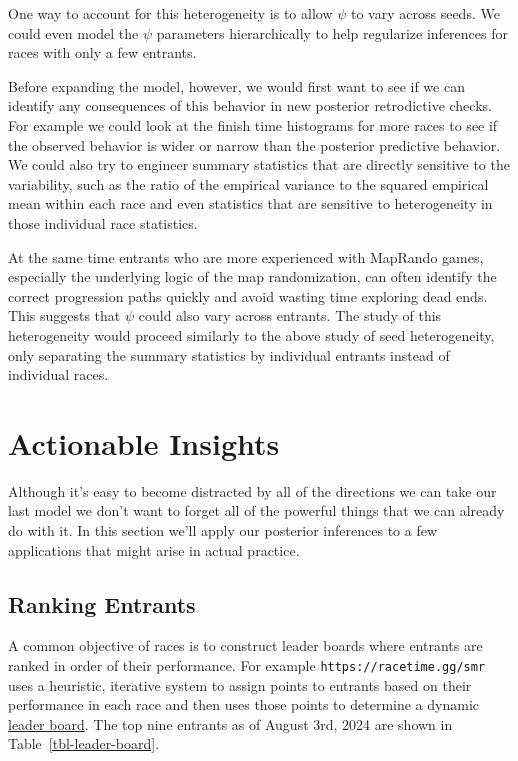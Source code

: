 \documentclass[
  letterpaper,
  DIV=11,
  numbers=noendperiod]{scrartcl}
\begin{document}
One way to account for this heterogeneity is to allow \(\psi\) to vary
across seeds. We could even model the \(\psi\) parameters hierarchically
to help regularize inferences for races with only a few entrants.

Before expanding the model, however, we would first want to see if we
can identify any consequences of this behavior in new posterior
retrodictive checks. For example we could look at the finish time
histograms for more races to see if the observed behavior is wider or
narrow than the posterior predictive behavior. We could also try to
engineer summary statistics that are directly sensitive to the
variability, such as the ratio of the empirical variance to the squared
empirical mean within each race and even statistics that are sensitive
to heterogeneity in those individual race statistics.

At the same time entrants who are more experienced with MapRando games,
especially the underlying logic of the map randomization, can often
identify the correct progression paths quickly and avoid wasting time
exploring dead ends. This suggests that \(\psi\) could also vary across
entrants. The study of this heterogeneity would proceed similarly to the
above study of seed heterogeneity, only separating the summary
statistics by individual entrants instead of individual races.

\section{Actionable Insights}\label{actionable-insights}

Although it's easy to become distracted by all of the directions we can
take our last model we don't want to forget all of the powerful things
that we can already do with it. In this section we'll apply our
posterior inferences to a few applications that might arise in actual
practice.

\subsection{Ranking Entrants}\label{ranking-entrants}

A common objective of races is to construct leader boards where entrants
are ranked in order of their performance. For example
\texttt{https://racetime.gg/smr} uses a heuristic, iterative system to
assign points to entrants based on their performance in each race and
then uses those points to determine a dynamic
\href{https://racetime.gg/smr/leaderboards}{leader board}. The top nine
entrants as of August 3rd, 2024 are shown in
Table~\ref{tbl-leader-board}.
\end{document}

